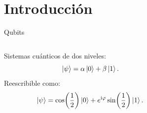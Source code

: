 \section{Introducción}
\begin{frame}{Qubits}
    \begin{columns}
        \begin{column}{0.5\textwidth}
            Sistemas cuánticos de dos niveles:
            \begin{equation}
                \ket{\psi}=\alpha\ket{0}+\beta\ket{1}.\nonumber
            \end{equation}
            Reescribible como:
            \begin{equation}
                \ket{\psi}=\cos(\frac{1}{2})\ket{0}+e^{\text{i}\varphi}\sin(\frac{1}{2})\ket{1}.\nonumber
            \end{equation}
        \end{column}
        \pause
        \begin{column}{0.5\textwidth}
            \centering
            \BlochSphere
        \end{column}
    \end{columns}
\end{frame}

